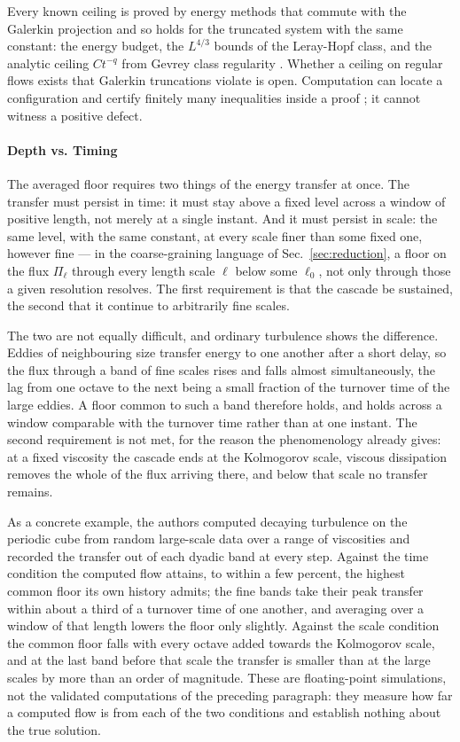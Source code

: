 \documentclass[letterpaper,twocolumn]{article}
\begin{document}
Every known ceiling is proved by energy methods that commute with the
Galerkin projection and so holds for the truncated system with the same
constant: the energy budget, the $L^{4/3}$ bounds of the Leray-Hopf
class, and the analytic ceiling $Ct^{-q}$ from Gevrey class regularity
\cite{FoiTem89}. Whether a ceiling on regular flows exists that Galerkin
truncations violate is open. Computation can locate a configuration and certify finitely
many inequalities inside a proof \cite{CheHou23}; it cannot witness a
positive defect.

\paragraph*{Depth vs. Timing}

The averaged floor requires two things of the energy transfer at once.
The transfer must persist in time: it must stay above a fixed level
across a window of positive length, not merely at a single instant. And
it must persist in scale: the same level, with the same constant, at
every scale finer than some fixed one, however fine --- in the
coarse-graining language of Sec.~\ref{sec:reduction}, a floor on the
flux $\Pi_\ell$ through every length scale $\ell$ below some $\ell_0$,
not only through those a given resolution resolves. The first
requirement is that the cascade be sustained, the second that it continue to
arbitrarily fine scales.

The two are not equally difficult, and ordinary turbulence shows the
difference. Eddies of neighbouring size transfer energy to one another
after a short delay, so the flux through a band of fine scales rises and
falls almost simultaneously, the lag from one octave to the next being a
small fraction of the turnover time of the large eddies. A floor common
to such a band therefore holds, and holds across a window comparable
with the turnover time rather than at one instant. The second
requirement is not met, for the reason the phenomenology already gives:
at a fixed viscosity the cascade ends at the Kolmogorov scale, viscous
dissipation removes the whole of the flux arriving there, and below that
scale no transfer remains.

As a concrete example, the authors computed decaying turbulence on the
periodic cube from random large-scale data over a range of viscosities
and recorded the transfer out of each dyadic band at every step. Against
the time condition the computed flow attains, to within a few percent,
the highest common floor its own history admits; the fine bands take
their peak transfer within about a third of a turnover time of one
another, and averaging over a window of that length lowers the floor
only slightly. Against the scale condition the common floor falls with
every octave added towards the Kolmogorov scale, and at the last band
before that scale the transfer is smaller than at the large scales by
more than an order of magnitude. These are floating-point simulations,
not the validated computations of the preceding paragraph: they measure
how far a computed flow is from each of the two conditions and establish
nothing about the true solution.
\end{document}
